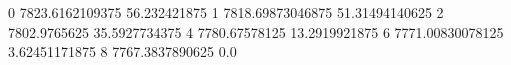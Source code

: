 0 7823.6162109375 56.232421875
1 7818.69873046875 51.31494140625
2 7802.9765625 35.5927734375
4 7780.67578125 13.2919921875
6 7771.00830078125 3.62451171875
8 7767.3837890625 0.0

